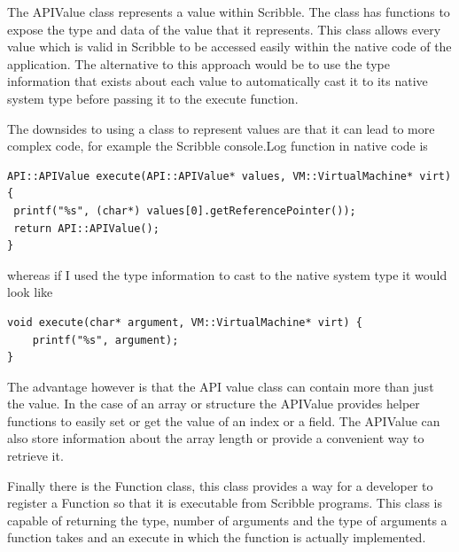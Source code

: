 \documentclass[]{final_report}
\begin{document}
The APIValue class represents a value within Scribble. The class has functions to expose the type and data of the value that it represents. This class allows every value which is valid in Scribble to be accessed easily within the native code of the application. The alternative to this approach would be to use the type information that exists about each value to automatically cast it to its native system type before passing it to the execute function.

The downsides to using a class to represent values are that it can lead to more complex code, for example the Scribble console.Log function in native code is 

\begin{verbatim}
API::APIValue execute(API::APIValue* values, VM::VirtualMachine* virt) {
 printf("%s", (char*) values[0].getReferencePointer());
 return API::APIValue();
}
\end{verbatim}

whereas if I used the type information to cast to the native system type it would look like

\begin{verbatim}
void execute(char* argument, VM::VirtualMachine* virt) {
	printf("%s", argument);
}
\end{verbatim}

The advantage however is that the API value class can contain more than just the value. In the case of an array or structure the APIValue provides helper functions to easily set or get the value of an index or a field. The APIValue can also store information about the array length or provide a convenient way to retrieve it.

Finally there is the Function class, this class provides a way for a developer to register a Function so that it is executable from Scribble programs. This class is capable of returning the type, number of arguments and the type of arguments a function takes and an execute in which the function is actually implemented.
\end{document}
